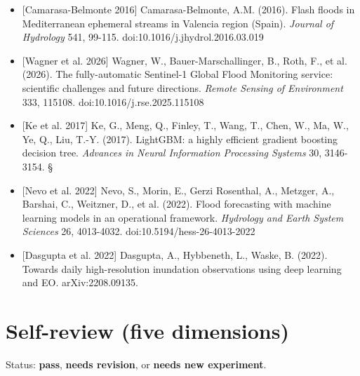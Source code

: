 \documentclass[10pt,twocolumn]{article}
\begin{document}
\begin{itemize}
\item{} [Camarasa-Belmonte 2016] Camarasa-Belmonte, A.M. (2016). Flash floods in Mediterranean ephemeral streams in Valencia region (Spain). \emph{Journal of Hydrology} 541, 99-115. doi:10.1016/j.jhydrol.2016.03.019
\item{} [Wagner et al. 2026] Wagner, W., Bauer-Marschallinger, B., Roth, F., et al. (2026). The fully-automatic Sentinel-1 Global Flood Monitoring service: scientific challenges and future directions. \emph{Remote Sensing of Environment} 333, 115108. doi:10.1016/j.rse.2025.115108
\item{} [Ke et al. 2017] Ke, G., Meng, Q., Finley, T., Wang, T., Chen, W., Ma, W., Ye, Q., Liu, T.-Y. (2017). LightGBM: a highly efficient gradient boosting decision tree. \emph{Advances in Neural Information Processing Systems} 30, 3146-3154. \S{}
\item{} [Nevo et al. 2022] Nevo, S., Morin, E., Gerzi Rosenthal, A., Metzger, A., Barshai, C., Weitzner, D., et al. (2022). Flood forecasting with machine learning models in an operational framework. \emph{Hydrology and Earth System Sciences} 26, 4013-4032. doi:10.5194/hess-26-4013-2022
\item{} [Dasgupta et al. 2022] Dasgupta, A., Hybbeneth, L., Waske, B. (2022). Towards daily high-resolution inundation observations using deep learning and EO. arXiv:2208.09135.
\end{itemize}
\onecolumn
\normalsize
\appendix
\section{Self-review (five dimensions)}
Status: \textbf{pass}, \textbf{needs revision}, or \textbf{needs new experiment}.
\end{document}
